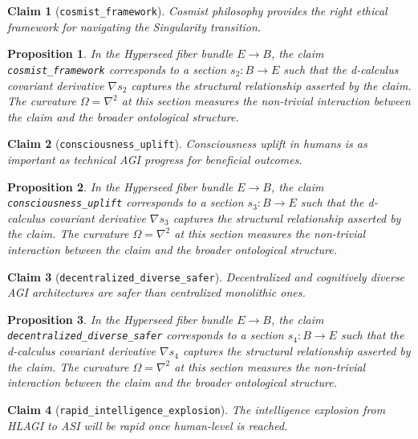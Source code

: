 \documentclass{article}
\newtheorem{claim}{Claim}
\newtheorem{proposition}{Proposition}
\begin{document}
\begin{claim}[\texttt{cosmist_framework}]
Cosmist philosophy provides the right ethical framework for navigating the Singularity transition.
\end{claim}

\begin{proposition}
In the Hyperseed fiber bundle $E \to B$, the claim \texttt{cosmist_framework} corresponds to a section $s_2: B \to E$ such that the d-calculus covariant derivative $\nabla s_2$ captures the structural relationship asserted by the claim. The curvature $\Omega = \nabla^2$ at this section measures the non-trivial interaction between the claim and the broader ontological structure.
\end{proposition}

\begin{claim}[\texttt{consciousness_uplift}]
Consciousness uplift in humans is as important as technical AGI progress for beneficial outcomes.
\end{claim}

\begin{proposition}
In the Hyperseed fiber bundle $E \to B$, the claim \texttt{consciousness_uplift} corresponds to a section $s_3: B \to E$ such that the d-calculus covariant derivative $\nabla s_3$ captures the structural relationship asserted by the claim. The curvature $\Omega = \nabla^2$ at this section measures the non-trivial interaction between the claim and the broader ontological structure.
\end{proposition}

\begin{claim}[\texttt{decentralized_diverse_safer}]
Decentralized and cognitively diverse AGI architectures are safer than centralized monolithic ones.
\end{claim}

\begin{proposition}
In the Hyperseed fiber bundle $E \to B$, the claim \texttt{decentralized_diverse_safer} corresponds to a section $s_4: B \to E$ such that the d-calculus covariant derivative $\nabla s_4$ captures the structural relationship asserted by the claim. The curvature $\Omega = \nabla^2$ at this section measures the non-trivial interaction between the claim and the broader ontological structure.
\end{proposition}

\begin{claim}[\texttt{rapid_intelligence_explosion}]
The intelligence explosion from HLAGI to ASI will be rapid once human-level is reached.
\end{claim}
\end{document}
